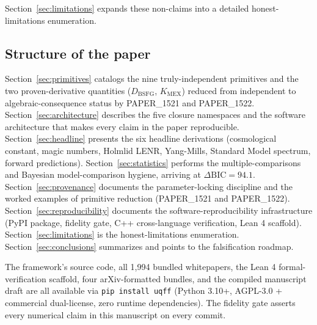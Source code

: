 Section~\ref{sec:limitations} expands these non-claims into a
detailed honest-limitations enumeration.

\subsection{Structure of the paper}
\label{sec:structure}

Section~\ref{sec:primitives} catalogs the nine truly-independent
primitives and the two proven-derivative quantities
($D_{\text{BSFG}}$, $K_{\text{MEX}}$) reduced from independent to
algebraic-consequence status by PAPER\_1521 and PAPER\_1522.
Section~\ref{sec:architecture} describes the five closure
namespaces and the software architecture that makes every claim
in the paper reproducible. Section~\ref{sec:headline} presents the
six headline derivations (cosmological constant, magic numbers,
Holmlid LENR, Yang-Mills, Standard Model spectrum, forward
predictions). Section~\ref{sec:statistics} performs the
multiple-comparisons and Bayesian model-comparison hygiene,
arriving at $\Delta\mathrm{BIC} = 94.1$.
Section~\ref{sec:provenance} documents the parameter-locking
discipline and the worked examples of primitive reduction
(PAPER\_1521 and PAPER\_1522). Section~\ref{sec:reproducibility}
documents the software-reproducibility infrastructure (PyPI
package, fidelity gate, C++ cross-language verification, Lean 4
scaffold). Section~\ref{sec:limitations} is the honest-limitations
enumeration. Section~\ref{sec:conclusions} summarizes and points
to the falsification roadmap.

The framework's source code, all 1{,}994 bundled whitepapers, the
Lean 4 formal-verification scaffold, four arXiv-formatted bundles,
and the compiled manuscript draft are all available via
\verb|pip install uqff| (Python 3.10+, AGPL-3.0 + commercial
dual-license, zero runtime dependencies). The fidelity gate
asserts every numerical claim in this manuscript on every commit.

